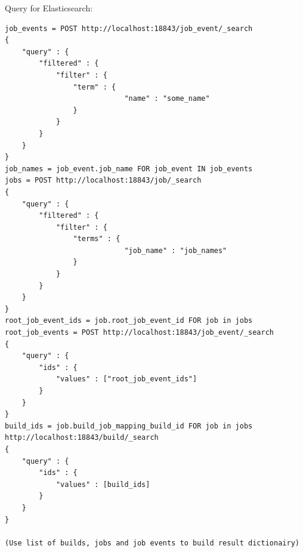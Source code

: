 Query for Elasticsearch:
\begin{verbatim}
job_events = POST http://localhost:18843/job_event/_search
{
    "query" : {
        "filtered" : {
            "filter" : {
                "term" : {
                            "name" : "some_name"
                }
            }
        }
    }
}
job_names = job_event.job_name FOR job_event IN job_events
jobs = POST http://localhost:18843/job/_search
{
    "query" : {
        "filtered" : {
            "filter" : {
                "terms" : {
                            "job_name" : "job_names"
                }
            }
        }
    }
}
root_job_event_ids = job.root_job_event_id FOR job in jobs
root_job_events = POST http://localhost:18843/job_event/_search
{ 
    "query" : {
        "ids" : { 
            "values" : ["root_job_event_ids"]
        }
    }
}
build_ids = job.build_job_mapping_build_id FOR job in jobs
http://localhost:18843/build/_search
{ 
    "query" : {
        "ids" : { 
            "values" : [build_ids]
        }
    }
}

(Use list of builds, jobs and job events to build result dictionairy)
\end{verbatim}

 
%
%



